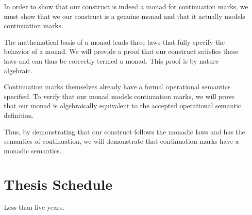 \documentclass[ms]{byuprop}
\newcounter{definition}
\begin{document}
In order to show that our construct is indeed a monad for continuation marks, we must show
that we our construct is a genuine monad and that it actually models continuation marks.

The mathematical basis of a monad lends three laws that fully specify the behavior of a 
monad. We will provide a proof that our construct satisfies these laws and can thus be 
correctly termed a monad. This proof is by nature algebraic.

Continuation marks themselves already have a formal operational semantics specified. To 
verify that our monad models continuation marks, we will prove that our monad is 
algebraically equivalent to the accepted operational semantic definition.

Thus, by demonstrating that our construct follows the monadic laws and has the semantics
of continuation, we will demonstrate that continuation marks have a monadic semantics.







\section{Thesis Schedule}

Less than five years.





\end{document}
